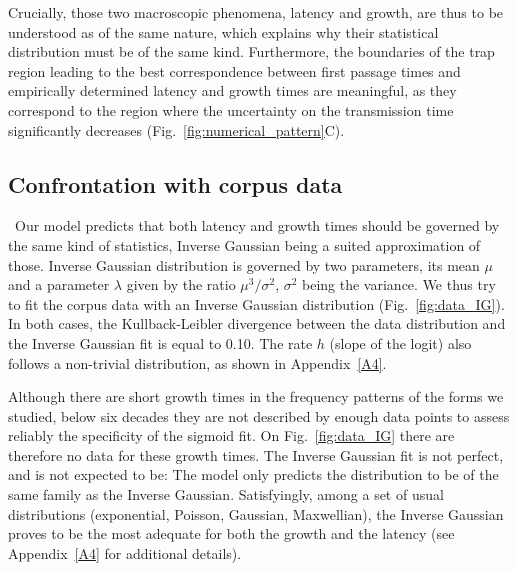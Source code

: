 \documentclass[12pt,twocolumn,amsmath,amssymb,aps,longbibliography]{revtex4-1}  %
\begin{document}
Crucially, those two macroscopic phenomena, latency and growth, are thus to be understood as of the same nature, which explains why their statistical distribution must be of the same kind. Furthermore, the boundaries of the trap region leading to the best correspondence between first passage times and empirically determined latency and growth times are meaningful, as they correspond to the region where the uncertainty on the transmission time significantly decreases (Fig.~\ref{fig:numerical_pattern}C). 

\subsection*{Confrontation with corpus data}
\ Our model predicts that both latency and growth times should be governed by the same kind of statistics, Inverse Gaussian being a suited approximation of those. Inverse Gaussian distribution is governed by two parameters, its mean $\mu$ and a parameter $\lambda$ given by the ratio $\mu^3 / \sigma^2$, $\sigma^2$ being the variance. We thus try to fit the corpus data with an Inverse Gaussian distribution (Fig.~\ref{fig:data_IG}). In both cases, the Kullback-Leibler divergence between the data distribution and the Inverse Gaussian fit is equal to 0.10. The rate $h$ (slope of the logit) also follows a non-trivial distribution, as shown in Appendix~\ref{A4}.

\begin{figure*}[!tbp]
\caption{\small Inverse Gaussian fit of the latency times $T_L$ (left) and the growth times $w$ (right), extracted from corpus data. Data points are shown by blue dots, the Inverse Gaussian fit being represented as a full red curve with star-shaped marks. The dashed red lines represent the standard deviation from the model. We detail in Materials \& Methods how we extracted these growth times and latency times from corpus data.}
\label{fig:data_IG}
\end{figure*}

Although there are short growth times in the frequency patterns of the forms we studied, below six decades they are not described by enough data points to assess reliably the specificity of the sigmoid fit. On Fig.~\ref{fig:data_IG} there are therefore no data for these growth times. The Inverse Gaussian fit is not perfect, and is not expected to be: The model only predicts the distribution to be of the same family as the Inverse Gaussian. Satisfyingly, among a set of usual distributions (exponential, Poisson, Gaussian, Maxwellian), the Inverse Gaussian proves to be the most adequate for both the growth and the latency (see Appendix~\ref{A4} for additional details).
\end{document}

